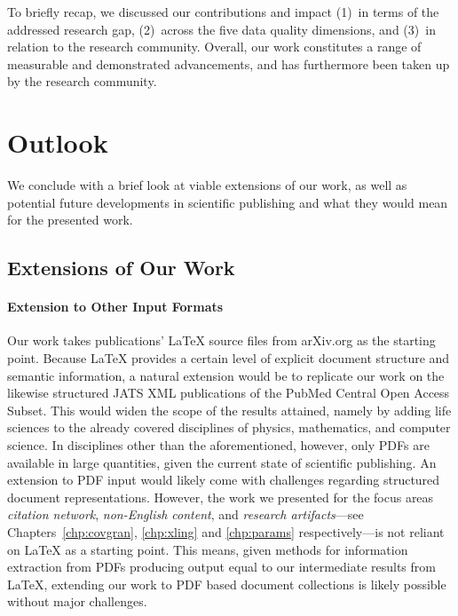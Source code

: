To briefly recap, we discussed our contributions and impact (1)~in terms of the addressed research gap, (2)~across the five data quality dimensions, and (3)~in relation to the research community. Overall, our work constitutes a range of measurable and demonstrated advancements, and has furthermore been taken up by the research community.


\section{Outlook}

We conclude with a brief look at viable extensions of our work, as well as potential future developments in scientific publishing and what they would mean for the presented work.

\subsection{Extensions of Our Work}

\paragraph{Extension to Other Input Formats}
Our work takes publications' \LaTeX{} source files from arXiv.org as the starting point. Because \LaTeX{} provides a certain level of explicit document structure and semantic information, a natural extension would be to replicate our work on the likewise structured JATS XML publications of the PubMed Central Open Access Subset. This would widen the scope of the results attained, namely by adding life sciences to the already covered disciplines of physics, mathematics, and computer science. In disciplines other than the aforementioned, however, only PDFs are available in large quantities, given the current state of scientific publishing. An extension to PDF input would likely come with challenges regarding structured document representations. However, the work we presented for the focus areas \emph{citation network}, \emph{non-English content}, and \emph{research artifacts}---see Chapters~\ref{chp:covgran}, \ref{chp:xling} and \ref{chp:params} respectively---is not reliant on \LaTeX{} as a starting point. This means, given methods for information extraction from PDFs producing output equal to our intermediate results from \LaTeX{}, extending our work to PDF based document collections is likely possible without major challenges.

